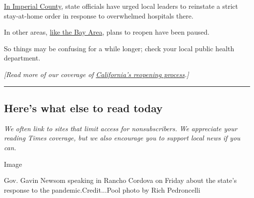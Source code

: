 \href{https://www.nytimes3xbfgragh.onion/2020/06/07/us/coronavirus-border-mexico-california-el-centro.html}{In
Imperial County}, state officials have urged local leaders to reinstate
a strict stay-at-home order in response to overwhelmed hospitals there.

In other areas,
\href{https://www.sfchronicle.com/bayarea/article/Coranivirus-cases-climb-Bay-Area-counties-pause-15375230.php}{like
the Bay Area}, plans to reopen have been paused.

So things may be confusing for a while longer; check your local public
health department.

\emph{{[}Read more of our coverage of}
\href{https://www.nytimes3xbfgragh.onion/article/coronavirus-california-reopening-phases.html}{\emph{California's
reopening process}}\emph{.{]}}

\begin{center}\rule{0.5\linewidth}{\linethickness}\end{center}

\hypertarget{heres-what-else-to-read-today}{%
\subsection{Here's what else to read
today}\label{heres-what-else-to-read-today}}

\emph{We often link to sites that limit access for nonsubscribers. We
appreciate your reading Times coverage, but we also encourage you to
support local news if you can.}

Image

Gov. Gavin Newsom speaking in Rancho Cordova on Friday about the state's
response to the pandemic.Credit...Pool photo by Rich Pedroncelli

